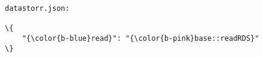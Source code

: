 \documentclass[class=minimal,border=0]{standalone}
\begin{document}
%
\begin{BVerbatim}[bgcolor=b-darkgrey]
datastorr.json:

\{
    "{\color{b-blue}read}": "{\color{b-pink}base::readRDS}"
\}
\end{BVerbatim}
\end{document}
